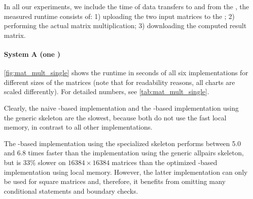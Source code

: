 In all our experiments, we include the time of data transfers to and from the \GPU, \ie the measured runtime consists of:
1) uploading the two input matrices to the \GPU;
2) performing the actual matrix multiplication;
3) downloading the computed result matrix.

\paragraph{System A (one \GPU)}
\autoref{fig:mat_mult_single} shows the runtime in seconds of all six implementations for different sizes of the matrices (note that for readability reasons, all charts are scaled differently).
For detailed numbers, see \autoref{tab:mat_mult_single}.

Clearly, the naive \OpenCL-based implementation and the \SkelCL-based implementation using the generic \allpairs skeleton are the slowest, because both do not use the fast \GPU local memory, in contrast to all other implementations.

The \SkelCL-based implementation using the specialized \allpairs skeleton performs between 5.0 and 6.8 times faster than the implementation using the generic allpairs skeleton, but is 33\% slower on $16384\times 16384$ matrices than the optimized \OpenCL-based implementation using local memory.
However, the latter implementation can only be used for square matrices and, therefore, it benefits from omitting many conditional statements and boundary checks.


